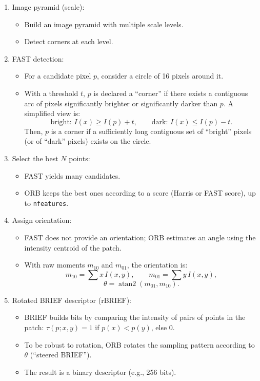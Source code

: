 \begin{enumerate}
    \item Image pyramid (scale):
    \begin{itemize}
        \item Build an image pyramid with multiple scale levels.
        \item Detect corners at each level.
    \end{itemize}

    \item FAST detection:
    \begin{itemize}
        \item For a candidate pixel $p$, consider a circle of 16 pixels around it.
        \item With a threshold $t$, $p$ is declared a ``corner'' if there exists a contiguous arc of pixels 
        significantly brighter or significantly darker than $p$. A simplified view is:
        $$
        \text{bright: } I(x) \ge I(p) + t,
        \qquad
        \text{dark: } I(x) \le I(p) - t.
        $$
        Then, $p$ is a corner if a sufficiently long contiguous set of ``bright'' pixels (or of ``dark'' pixels) 
        exists on the circle.
    \end{itemize}

    \item Select the best $N$ points:
    \begin{itemize}
        \item FAST yields many candidates.
        \item ORB keeps the best ones according to a score (Harris or FAST score), up to \texttt{nfeatures}.
    \end{itemize}

    \item Assign orientation:
    \begin{itemize}
        \item FAST does not provide an orientation; ORB estimates an angle using the intensity centroid of the patch.
        \item With raw moments $m_{10}$ and $m_{01}$, the orientation is:
        $$
        m_{10} = \sum x\,I(x,y),
        \qquad
        m_{01} = \sum y\,I(x,y),
        $$
        $$
        \theta = \operatorname{atan2}(m_{01}, m_{10}).
        $$
    \end{itemize}

    \item Rotated BRIEF descriptor (rBRIEF):
    \begin{itemize}
        \item BRIEF builds bits by comparing the intensity of pairs of points in the patch: 
        $\tau(p;x,y)=1$ if $p(x) < p(y)$, else $0$.
        \item To be robust to rotation, ORB rotates the sampling pattern according to $\theta$ 
        (``steered BRIEF'').
        \item The result is a binary descriptor (e.g., 256 bits).
    \end{itemize}


\end{enumerate}

